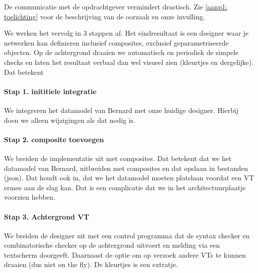 \begin{aanpassing1}
De communicatie met de opdrachtgever vermindert drastisch. Zie \ref{aanp1: toelichting} voor de beschrijving van de oorzaak en onze invulling.

We werken het vervolg in 3 stappen af. Het eindresultaat is een designer waar je netwerken kan definieren inclusief composites, exclusief 
geparametriseerde objecten. Op de achtergrond draaien we automatisch en periodiek de simpele checks en 
laten het resultaat verbaal dan wel visueel zien (kleurtjes en dergelijke). Dat betekent

\paragraph{Stap 1. inititiele integratie} 

We integreren het datamodel van Bernard met onze huidige designer. Hierbij doen we alleen wijzigingen als dat nodig is.

\paragraph{Stap 2. composite toevoegen}

We breiden de implementatie uit met composites. Dat betekent dat we het datamodel van Bernard, uitbreiden met composites en dat opslaan in bestanden (json). Dat houdt ook in, dat we het datamodel moeten platslaan voordat een VT ermee aan de slag kan. Dat is een complicatie dat we in het architectuurplaatje voorzien hebben.

\paragraph{Stap 3. Achtergrond VT}

We breiden de designer uit met een control programma dat de syntax checker en combinatorische checker op de achtergrond uitvoert en melding via een textscherm doorgeeft. Daarnaast de optie om op verzoek andere VTs te kunnen draaien (dus niet on the fly). De kleurtjes is een extratje.

\end{aanpassing1}
